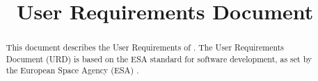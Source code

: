 

\title{User Requirements Document}

\newcommand{\TitleFull}{User Requirements Document}
\newcommand{\TitelAbbr}{URD}
\newcommand{\Version}{0.1}



\maketitle

\begin{abstract}
This document describes the User Requirements of \projectname. The User Requirements Document (URD) is based on the ESA standard for software development, as set by the European Space Agency (ESA) \cite{esa}.
\end{abstract}

\tableofcontents












